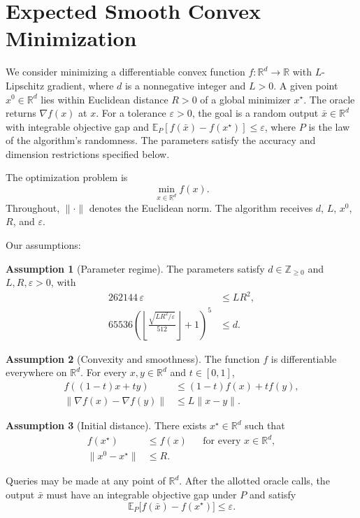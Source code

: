 \documentclass[10pt]{article}
\theoremstyle{definition}
\newtheorem{assumption}{Assumption}
\begin{document}
\section*{Expected Smooth Convex Minimization}
We consider minimizing a differentiable convex function $f:\mathbb{R}^d\to\mathbb{R}$ with $L$-Lipschitz gradient, where $d$ is a nonnegative integer and $L>0$. A given point $x^0\in\mathbb{R}^d$ lies within Euclidean distance $R>0$ of a global minimizer $x^\star$. The oracle returns $\nabla f(x)$ at $x$. For a tolerance $\varepsilon>0$, the goal is a random output $\bar{x}\in\mathbb{R}^d$ with integrable objective gap and $\mathbb{E}_{P}[f(\bar{x})-f(x^\star)]\leq\varepsilon$, where $P$ is the law of the algorithm's randomness. The parameters satisfy the accuracy and dimension restrictions specified below.

The optimization problem is
\[
\min_{x\in\mathbb{R}^d} f(x).
\]
Throughout, $\|\cdot\|$ denotes the Euclidean norm. The algorithm receives $d$, $L$, $x^0$, $R$, and $\varepsilon$.

Our assumptions:
\begin{assumption}[Parameter regime]
The parameters satisfy $d\in\mathbb{Z}_{\geq 0}$ and $L,R,\varepsilon>0$, with
\[
\begin{aligned}
262144\,\varepsilon &\leq LR^2,\\
65536\left(\left\lfloor
\frac{\sqrt{LR^2/\varepsilon}}{512}
\right\rfloor+1\right)^5 &\leq d.
\end{aligned}
\]
\end{assumption}

\begin{assumption}[Convexity and smoothness]
The function $f$ is differentiable everywhere on $\mathbb{R}^d$. For every $x,y\in\mathbb{R}^d$ and $t\in[0,1]$,
\[
\begin{aligned}
f((1-t)x+ty)&\leq (1-t)f(x)+tf(y),\\
\|\nabla f(x)-\nabla f(y)\|&\leq L\|x-y\|.
\end{aligned}
\]
\end{assumption}

\begin{assumption}[Initial distance]
There exists $x^\star\in\mathbb{R}^d$ such that
\[
\begin{aligned}
f(x^\star)&\leq f(x)
&&\text{for every }x\in\mathbb{R}^d,\\
\|x^0-x^\star\|&\leq R.
\end{aligned}
\]
\end{assumption}

Queries may be made at any point of $\mathbb{R}^d$. After the allotted oracle calls, the output $\bar{x}$ must have an integrable objective gap under $P$ and satisfy
\[
\mathbb{E}_{P}\bigl[f(\bar{x})-f(x^\star)\bigr]
\leq\varepsilon.
\]
\end{document}
